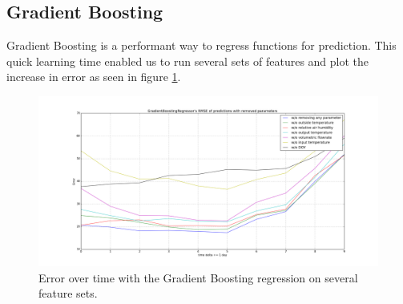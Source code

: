 \documentclass{scrartcl}
\begin{document}
\subsection{Gradient Boosting}
Gradient Boosting is a performant way to regress functions for prediction. This quick learning time enabled us to run several sets of features and  plot the increase in error as seen in figure \ref{fig:GradientBoostingRegressor_day_error_without_some_params}. 

\begin{figure}[H]
  \center
  \includegraphics[width=1\linewidth]{img/GradientBoostingRegressor_day_error_without_some_params.png}
  \caption{Error over time with the Gradient Boosting regression on several feature sets.}
  \label{fig:GradientBoostingRegressor_day_error_without_some_params}
\end{figure}
\newpage
\end{document}
